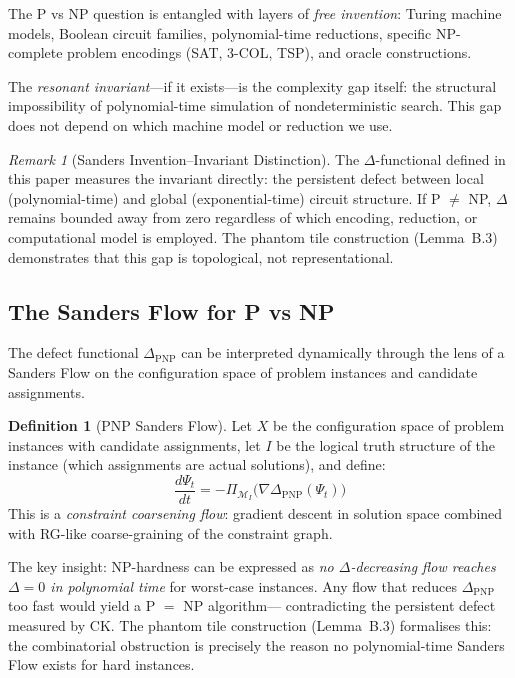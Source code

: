 \documentclass[11pt]{article}
\theoremstyle{definition}
\newtheorem{definition}[theorem]{Definition}
\theoremstyle{remark}
\newtheorem{remark}[theorem]{Remark}
\begin{document}
The P vs NP question is entangled with layers of \emph{free invention}: Turing machine
models, Boolean circuit families, polynomial-time reductions, specific NP-complete
problem encodings (SAT, 3-COL, TSP), and oracle constructions.

The \emph{resonant invariant}---if it exists---is the complexity gap itself: the
structural impossibility of polynomial-time simulation of nondeterministic search.
This gap does not depend on which machine model or reduction we use.

\begin{remark}[Sanders Invention--Invariant Distinction]
The $\Delta$-functional defined in this paper measures the invariant directly:
the persistent defect between local (polynomial-time) and global (exponential-time)
circuit structure. If P $\neq$ NP, $\Delta$ remains bounded away from zero
regardless of which encoding, reduction, or computational model is employed.
The phantom tile construction (Lemma~B.3) demonstrates that this gap is
topological, not representational.
\end{remark}

\subsection*{The Sanders Flow for P vs NP}

The defect functional $\Delta_{\mathrm{PNP}}$ can be interpreted dynamically through
the lens of a Sanders Flow on the configuration space of problem instances and
candidate assignments.

\begin{definition}[PNP Sanders Flow]
Let $X$ be the configuration space of problem instances with candidate assignments,
let $I$ be the logical truth structure of the instance (which assignments are actual
solutions), and define:
\[
  \frac{d\Psi_t}{dt} = -\Pi_{\mathcal{M}_I}\!\bigl(\nabla \Delta_{\mathrm{PNP}}(\Psi_t)\bigr)
\]
This is a \emph{constraint coarsening flow}: gradient descent in solution space combined
with RG-like coarse-graining of the constraint graph.
\end{definition}

\noindent
The key insight: NP-hardness can be expressed as \emph{no $\Delta$-decreasing flow
reaches $\Delta = 0$ in polynomial time} for worst-case instances. Any flow that
reduces $\Delta_{\mathrm{PNP}}$ too fast would yield a P $=$ NP algorithm---
contradicting the persistent defect measured by CK.  The phantom tile construction
(Lemma~B.3) formalises this: the combinatorial obstruction is precisely the reason
no polynomial-time Sanders Flow exists for hard instances.
\end{document}
